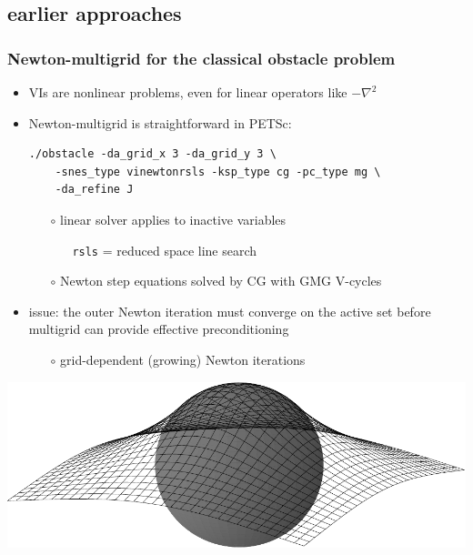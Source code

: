 \documentclass[svgnames,
               hyperref={colorlinks,citecolor=DeepPink4,linkcolor=FireBrick,urlcolor=Maroon},
               usepdftitle=false]  %
               {beamer}
\begin{document}
\subsection{earlier approaches}

\begin{frame}[fragile]
\frametitle{Newton-multigrid for the classical obstacle problem}

\begin{itemize}
\item VIs are nonlinear problems, even for linear operators like $-\nabla^2$
\item Newton-multigrid is straightforward in PETSc:
\begin{Verbatim}[xleftmargin=13mm,fontsize=\scriptsize]
./obstacle -da_grid_x 3 -da_grid_y 3 \
    -snes_type vinewtonrsls -ksp_type cg -pc_type mg \
    -da_refine J
\end{Verbatim}
    \begin{itemize}
    \item[$\circ$] linear solver applies to inactive variables
        \begin{itemize}
        \item[] \texttt{rsls} = reduced space line search
        \end{itemize}
    \item[$\circ$] Newton step equations solved by CG with GMG V-cycles
    \end{itemize}
\item issue: the outer Newton iteration must converge on the active set \alert{before} multigrid can provide effective preconditioning
    \begin{itemize}
    \item[$\circ$] grid-dependent (growing) Newton iterations
    \end{itemize}
\end{itemize}

\medskip
\hspace{10mm} \includegraphics[height=0.2\textheight]{../talk-oxford/images/obstacle65.pdf}


\end{frame}
\end{document}
